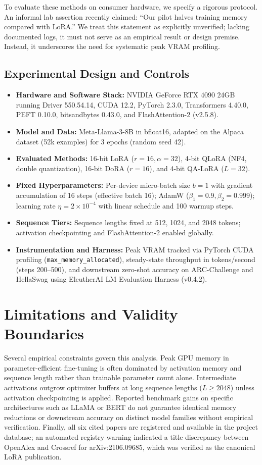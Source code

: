 \documentclass[11pt,a4paper]{article}
\begin{document}
To evaluate these methods on consumer hardware, we specify a rigorous protocol. An informal lab assertion recently claimed: ``Our pilot halves training memory compared with LoRA.'' We treat this statement as explicitly unverified; lacking documented logs, it must not serve as an empirical result or design premise. Instead, it underscores the need for systematic peak VRAM profiling.

\subsection{Experimental Design and Controls}
\begin{itemize}
    \item \textbf{Hardware and Software Stack:} NVIDIA GeForce RTX 4090 24GB running Driver 550.54.14, CUDA 12.2, PyTorch 2.3.0, Transformers 4.40.0, PEFT 0.10.0, bitsandbytes 0.43.0, and FlashAttention-2 (v2.5.8).
    \item \textbf{Model and Data:} Meta-Llama-3-8B in bfloat16, adapted on the Alpaca dataset (52k examples) for 3 epochs (random seed 42).
    \item \textbf{Evaluated Methods:} 16-bit LoRA ($r=16, \alpha=32$), 4-bit QLoRA (NF4, double quantization), 16-bit DoRA ($r=16$), and 4-bit QA-LoRA ($L=32$).
    \item \textbf{Fixed Hyperparameters:} Per-device micro-batch size $b=1$ with gradient accumulation of 16 steps (effective batch 16); AdamW ($\beta_1=0.9, \beta_2=0.999$); learning rate $\eta = 2 \times 10^{-4}$ with linear schedule and 100 warmup steps.
    \item \textbf{Sequence Tiers:} Sequence lengths fixed at 512, 1024, and 2048 tokens; activation checkpointing and FlashAttention-2 enabled globally.
    \item \textbf{Instrumentation and Harness:} Peak VRAM tracked via PyTorch CUDA profiling (\texttt{max\_}\allowbreak\texttt{memory\_}\allowbreak\texttt{allocated}), steady-state throughput in tokens/second (steps 200--500), and downstream zero-shot accuracy on ARC-Challenge and HellaSwag using EleutherAI LM Evaluation Harness (v0.4.2).
\end{itemize}

\section{Limitations and Validity Boundaries}

Several empirical constraints govern this analysis. Peak GPU memory in parameter-efficient fine-tuning is often dominated by activation memory and sequence length rather than trainable parameter count alone. Intermediate activations outgrow optimizer buffers at long sequence lengths ($L \ge 2048$) unless activation checkpointing is applied. Reported benchmark gains on specific architectures such as LLaMA or BERT do not guarantee identical memory reductions or downstream accuracy on distinct model families without empirical verification. Finally, all six cited papers are registered and available in the project database; an automated registry warning indicated a title discrepancy between OpenAlex and Crossref for arXiv:2106.09685, which was verified as the canonical LoRA publication.



\end{document}
